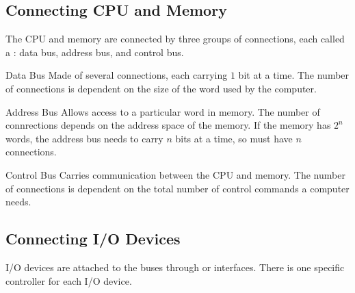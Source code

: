 \documentclass[\main/notes.tex]{subfiles}
\begin{document}
			\subsection{Connecting CPU and Memory}
				The CPU and memory are connected by three groups of connections, each called a : data bus, address bus, and control bus.
					\begin{definition}{Data Bus}
						Made of several connections, each carrying $1$ bit at a time. The number of connections is dependent on the size of the word used by the computer.
					\end{definition}
					\begin{definition}{Address Bus}
						Allows access to a particular word in memory. The number of connrections depends on the address space of the memory. If the memory has $2^{n}$ words, the address bus needs to carry $n$ bits at a time, so must have $n$ connections.
					\end{definition}
					\begin{definition}{Control Bus}
						Carries communication between the CPU and memory. The number of connections is dependent on the total number of control commands a computer needs.
					\end{definition}
			\pagebreak
			\subsection{Connecting I/O Devices}
				I/O devices are attached to the buses through  or interfaces. There is one specific controller for each I/O device.
\end{document}
